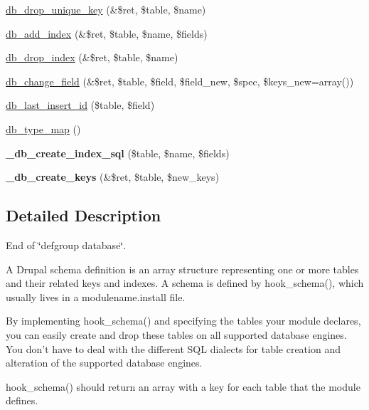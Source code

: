 \begin{CompactItemize}
\hyperlink{group__schemaapi_g727ffb0cbdb6bc2afd5803b09e296603}{db\_\-drop\_\-unique\_\-key} (\&\$ret, \$table, \$name)
\item 
\hyperlink{group__schemaapi_gaaa3b734b6b1acc09fb5e2ac8bd7d925}{db\_\-add\_\-index} (\&\$ret, \$table, \$name, \$fields)
\item 
\hyperlink{group__schemaapi_g3a9c0b20502c5afb8177be5753f8cdbb}{db\_\-drop\_\-index} (\&\$ret, \$table, \$name)
\item 
\hyperlink{group__schemaapi_g03f152245358d2db68d067aa8a1fceb4}{db\_\-change\_\-field} (\&\$ret, \$table, \$field, \$field\_\-new, \$spec, \$keys\_\-new=array())
\item 
\hyperlink{group__schemaapi_g1d29b142caeee2f0f2217be16857b9ae}{db\_\-last\_\-insert\_\-id} (\$table, \$field)
\end{CompactItemize}
\begin{CompactItemize}
\item 
\hyperlink{group__schemaapi_gadf0495656599ba9336d68675b54f8dd}{db\_\-type\_\-map} ()
\item 
\hypertarget{group__schemaapi_g67b8a831a7fa968df49a645b11173e82}{
\textbf{\_\-db\_\-create\_\-index\_\-sql} (\$table, \$name, \$fields)}
\label{group__schemaapi_g67b8a831a7fa968df49a645b11173e82}

\item 
\hypertarget{group__schemaapi_g40102607d0c0d76f92fc9acd18bd9cc9}{
\textbf{\_\-db\_\-create\_\-keys} (\&\$ret, \$table, \$new\_\-keys)}
\label{group__schemaapi_g40102607d0c0d76f92fc9acd18bd9cc9}

\end{CompactItemize}


\subsection{Detailed Description}
End of \char`\"{}defgroup database\char`\"{}.

A Drupal schema definition is an array structure representing one or more tables and their related keys and indexes. A schema is defined by hook\_\-schema(), which usually lives in a modulename.install file.

By implementing hook\_\-schema() and specifying the tables your module declares, you can easily create and drop these tables on all supported database engines. You don't have to deal with the different SQL dialects for table creation and alteration of the supported database engines.

hook\_\-schema() should return an array with a key for each table that the module defines.

